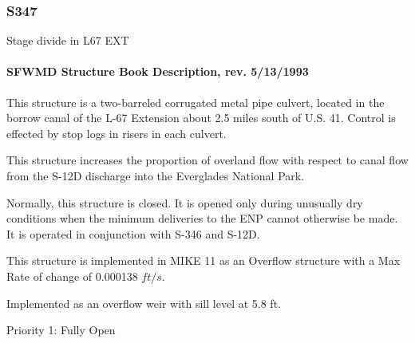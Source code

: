 \clearpage
\subsubsection{S347}
Stage divide in L67 EXT

\paragraph{SFWMD Structure Book Description, rev. 5/13/1993}
This structure is a two-barreled corrugated metal pipe culvert, located in the borrow canal of
the L-67 Extension about 2.5 miles south of U.S. 41. Control is effected by stop logs in risers in each
culvert.

This structure increases the proportion of overland flow with respect to canal flow from the S-12D discharge into the Everglades National Park.

Normally, this structure is closed. It is opened only during unusually dry conditions when the minimum deliveries to the ENP cannot otherwise be made. It is operated in conjunction with S-346 and S-12D.

This structure is implemented in MIKE 11 as an Overflow structure with a Max Rate of change of 0.000138 $ft/s$.



Implemented as an overflow weir with sill level at 5.8 ft.

\begin{packed_items}
\item Priority 1: Fully Open
\end{packed_items}

